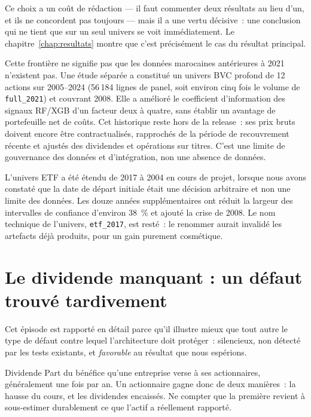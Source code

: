 Ce choix a un coût de rédaction — il faut commenter deux résultats au lieu d'un,
et ils ne concordent pas toujours — mais il a une vertu décisive~: une conclusion
qui ne tient que sur un seul univers se voit immédiatement. Le
chapitre~\ref{chap:resultats} montre que c'est précisément le cas du résultat
principal.

Cette frontière ne signifie pas que les données marocaines antérieures à 2021
n'existent pas. Une étude séparée a constitué un univers BVC profond de 12 actions
sur 2005--2024 (56\,184 lignes de panel, soit environ cinq fois le volume de
\texttt{full\_2021}) et couvrant 2008. Elle a amélioré le coefficient
d'information des signaux RF/XGB d'un facteur deux à quatre, sans établir un
avantage de portefeuille net de coûts. Cet historique reste hors de la release~:
ses prix bruts doivent encore être contractualisés, rapprochés de la période de
recouvrement récente et ajustés des dividendes et opérations sur titres. C'est une
limite de gouvernance des données et d'intégration, non une absence de données.

\begin{remarquebox}
L'univers ETF a été étendu de 2017 à 2004 en cours de projet, lorsque nous avons
constaté que la date de départ initiale était une décision arbitraire et non une
limite des données. Les douze années supplémentaires ont réduit la largeur des
intervalles de confiance d'environ 38~\% et ajouté la crise de 2008. Le nom
technique de l'univers, \texttt{etf\_2017}, est resté~: le renommer aurait
invalidé les artefacts déjà produits, pour un gain purement cosmétique.
\end{remarquebox}

\section{Le dividende manquant : un défaut trouvé tardivement}

Cet épisode est rapporté en détail parce qu'il illustre mieux que tout autre le
type de défaut contre lequel l'architecture doit protéger~: silencieux, non
détecté par les tests existants, et \emph{favorable} au résultat que nous
espérions.

\begin{definitionbox}{Dividende}
Part du bénéfice qu'une entreprise verse à ses actionnaires, généralement une
fois par an. Un actionnaire gagne donc de deux manières~: la hausse du cours, et
les dividendes encaissés. Ne compter que la première revient à sous-estimer
durablement ce que l'actif a réellement rapporté.
\end{definitionbox}

